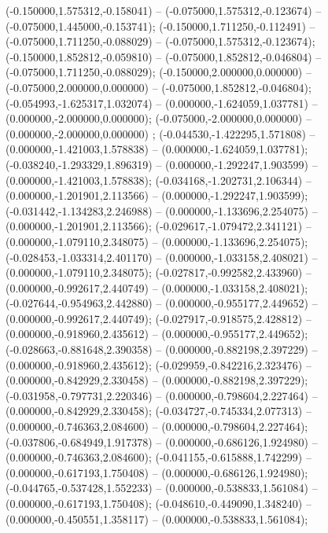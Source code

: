  (-0.150000,1.575312,-0.158041) -- (-0.075000,1.575312,-0.123674) -- (-0.075000,1.445000,-0.153741);
 (-0.150000,1.711250,-0.112491) -- (-0.075000,1.711250,-0.088029) -- (-0.075000,1.575312,-0.123674);
 (-0.150000,1.852812,-0.059810) -- (-0.075000,1.852812,-0.046804) -- (-0.075000,1.711250,-0.088029);
 (-0.150000,2.000000,0.000000) -- (-0.075000,2.000000,0.000000) -- (-0.075000,1.852812,-0.046804);
 (-0.054993,-1.625317,1.032074) -- (0.000000,-1.624059,1.037781) -- (0.000000,-2.000000,0.000000);
 (-0.075000,-2.000000,0.000000) -- (0.000000,-2.000000,0.000000) ;
 (-0.044530,-1.422295,1.571808) -- (0.000000,-1.421003,1.578838) -- (0.000000,-1.624059,1.037781);
 (-0.038240,-1.293329,1.896319) -- (0.000000,-1.292247,1.903599) -- (0.000000,-1.421003,1.578838);
 (-0.034168,-1.202731,2.106344) -- (0.000000,-1.201901,2.113566) -- (0.000000,-1.292247,1.903599);
 (-0.031442,-1.134283,2.246988) -- (0.000000,-1.133696,2.254075) -- (0.000000,-1.201901,2.113566);
 (-0.029617,-1.079472,2.341121) -- (0.000000,-1.079110,2.348075) -- (0.000000,-1.133696,2.254075);
 (-0.028453,-1.033314,2.401170) -- (0.000000,-1.033158,2.408021) -- (0.000000,-1.079110,2.348075);
 (-0.027817,-0.992582,2.433960) -- (0.000000,-0.992617,2.440749) -- (0.000000,-1.033158,2.408021);
 (-0.027644,-0.954963,2.442880) -- (0.000000,-0.955177,2.449652) -- (0.000000,-0.992617,2.440749);
 (-0.027917,-0.918575,2.428812) -- (0.000000,-0.918960,2.435612) -- (0.000000,-0.955177,2.449652);
 (-0.028663,-0.881648,2.390358) -- (0.000000,-0.882198,2.397229) -- (0.000000,-0.918960,2.435612);
 (-0.029959,-0.842216,2.323476) -- (0.000000,-0.842929,2.330458) -- (0.000000,-0.882198,2.397229);
 (-0.031958,-0.797731,2.220346) -- (0.000000,-0.798604,2.227464) -- (0.000000,-0.842929,2.330458);
 (-0.034727,-0.745334,2.077313) -- (0.000000,-0.746363,2.084600) -- (0.000000,-0.798604,2.227464);
 (-0.037806,-0.684949,1.917378) -- (0.000000,-0.686126,1.924980) -- (0.000000,-0.746363,2.084600);
 (-0.041155,-0.615888,1.742299) -- (0.000000,-0.617193,1.750408) -- (0.000000,-0.686126,1.924980);
 (-0.044765,-0.537428,1.552233) -- (0.000000,-0.538833,1.561084) -- (0.000000,-0.617193,1.750408);
 (-0.048610,-0.449090,1.348240) -- (0.000000,-0.450551,1.358117) -- (0.000000,-0.538833,1.561084);
